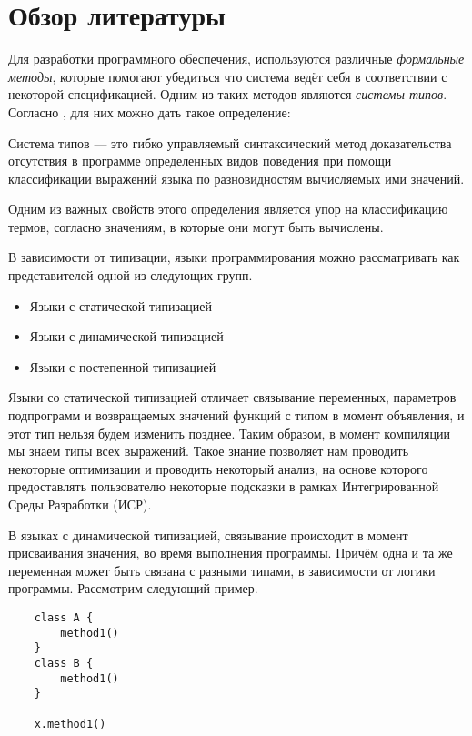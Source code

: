 \section{Обзор литературы}

Для разработки программного обеспечения, используются различные \textit{формальные методы}, которые помогают убедиться что система ведёт себя в соответствии с некоторой спецификацией. Одним из таких методов являются \textit{системы типов}. Согласно \cite{book:pierce2002types}, для них можно дать такое определение:


\begin{definition}
Система типов --- это гибко управляемый синтаксический метод доказательства отсутствия в программе определенных видов поведения при помощи классификации выражений языка по разновидностям вычисляемых ими значений.
\end{definition}

Одним из важных свойств этого определения является упор на классификацию термов, согласно значениям, в которые они могут быть вычислены.

В зависимости от типизации, языки программирования можно рассматривать как представителей одной из следующих групп.
\begin{itemize}
\itemsep-1mm
\item Языки с статической типизацией
\item Языки с динамической типизацией
\item Языки с постепенной типизацией
\end{itemize}



Языки со статической типизацией отличает связывание переменных, параметров подпрограмм и возвращаемых значений функций с типом в момент объявления, и этот тип нельзя будем изменить позднее. Таким образом, в момент компиляции мы знаем типы всех выражений. Такое знание позволяет нам проводить некоторые оптимизации и проводить некоторый анализ, на основе которого предоставлять пользователю некоторые подсказки в рамках Интегрированной Среды Разработки (ИСР).

В языках с динамической типизацией, связывание происходит в момент присваивания  значения, во время выполнения программы. Причём одна и та же переменная может быть связана с разными типами, в зависимости от логики программы. Рассмотрим следующий пример.

\vskip4pt

\begin{verbatim}
    class A {
        method1()
    }
    class B {
        method1()
    }

    x.method1()
\end{verbatim}

